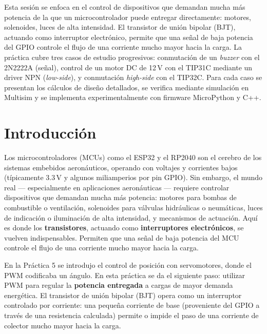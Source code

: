 \documentclass[11pt]{article}
\begin{document}
\portada

\begin{resumen}
Esta sesión se enfoca en el control de dispositivos que demandan mucha más potencia de
la que un microcontrolador puede entregar directamente: motores, solenoides, luces de
alta intensidad. El transistor de unión bipolar (BJT), actuando como interruptor
electrónico, permite que una señal de baja potencia del GPIO controle el flujo de una
corriente mucho mayor hacia la carga. La práctica cubre tres casos de estudio
progresivos: conmutación de un \emph{buzzer} con el 2N2222A (señal), control de un motor
DC de 12\,V con el TIP31C mediante un driver NPN (\emph{low-side}), y conmutación
\emph{high-side} con el TIP32C. Para cada caso se presentan los cálculos de diseño
detallados, se verifica mediante simulación en Multisim y se implementa
experimentalmente con firmware MicroPython y C++.
\end{resumen}

\tableofcontents
\newpage

\section{Introducción}

Los microcontroladores (MCUs) como el ESP32 y el RP2040 son el cerebro de los sistemas
embebidos aeronáuticos, operando con voltajes y corrientes bajos (típicamente 3.3\,V y
algunos miliamperios por pin GPIO). Sin embargo, el mundo real — especialmente en
aplicaciones aeronáuticas — requiere controlar dispositivos que demandan mucha más
potencia: motores para bombas de combustible o ventilación, solenoides para válvulas
hidráulicas o neumáticas, luces de indicación o iluminación de alta intensidad, y
mecanismos de actuación. Aquí es donde los \textbf{transistores}, actuando como
\textbf{interruptores electrónicos}, se vuelven indispensables. Permiten que una señal
de baja potencia del MCU controle el flujo de una corriente mucho mayor hacia la carga.

En la Práctica 5 se introdujo el control de posición con servomotores, donde el PWM
codificaba un ángulo. En esta práctica se da el siguiente paso: utilizar PWM para regular
la \textbf{potencia entregada} a cargas de mayor demanda energética. El transistor de
unión bipolar (BJT) opera como un interruptor controlado por corriente: una pequeña
corriente de base (proveniente del GPIO a través de una resistencia calculada) permite o
impide el paso de una corriente de colector mucho mayor hacia la carga.
\end{document}

